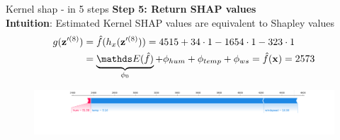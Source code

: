 \documentclass[11pt,compress,t,notes=noshow, aspectratio=169, xcolor=table]{beamer}
\begin{document}
\begin{frame}{Kernel shap - in 5 steps}
\textbf{Step 5: Return SHAP values}\\\medskip
\textbf{Intuition}: Estimated Kernel SHAP values are equivalent to Shapley values 
\begin{align*}
g(\mathbf{z}^{\prime (8)}) &= \fh(h_x(\mathbf{z}^{\prime (8)}) ) = 4515 + 34 \cdot 1 - 1654 \cdot 1 - 323 \cdot 1\\&= \underbrace{\E(\fh)}_{\phi_0} + \phi_{hum} + \phi_{temp} + \phi_{ws} = \fh(\xv) = 2573
\end{align*}

\begin{figure}
    \centering
    \includegraphics[width=\columnwidth]{figure_man/exSHAP.png}
\end{figure}

\end{frame}


\end{document}
